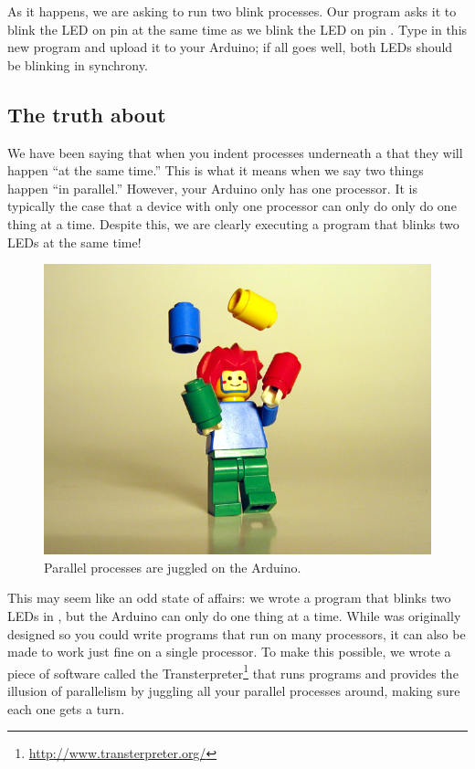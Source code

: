 	\newpage
	
As it happens, we are asking \plumbing to run two {\procname blink} processes. Our program asks it to blink the LED on pin \pintwelve at the same time as we blink the LED on pin \pineleven. Type in this new program and upload it to your Arduino; if all goes well, both LEDs should be blinking in synchrony.

\subsection{The truth about \PAR}


We have been saying that when you indent processes underneath a \PAR that they will happen ``at the same time.'' This is what it means when we say two things happen ``in parallel.'' However, your {\strong Arduino only has one processor}. It is typically the case that a device with only one processor can only do only do one thing at a time. Despite this, we are clearly executing a program that blinks two LEDs at the same time!

\newpage

\begin{figure}[ht]
  \begin{center}
    \includegraphics[width=0.8\linewidth]{images/juggling}
    \caption{Parallel processes are juggled on the Arduino.}
  \end{center}
\end{figure}

This may seem like an odd state of affairs: we wrote a program that blinks two LEDs in \PARallel, but the Arduino can only do one thing at a time. While \occam was originally designed so you could write programs that run on many processors, it can also be made to work just fine on a single processor. To make this possible, we wrote a piece of software called the Transterpreter\footnote{\url{http://www.transterpreter.org/}} that runs \occam programs and provides the illusion of parallelism by juggling all your parallel processes around, making sure each one gets a turn. 

